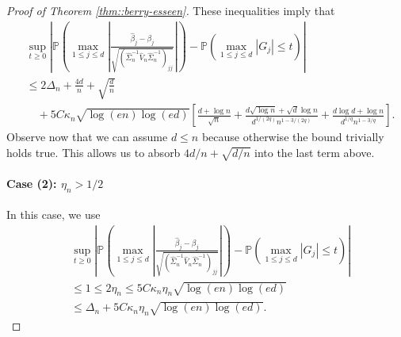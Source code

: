 \documentclass[11pt]{article}
\begin{document}
\begin{appendices}
\begin{proof}[Proof of Theorem \ref{thm::berry-esseen}]
These inequalities imply that
\begin{align*}
&\sup_{t\ge 0}\left|\mathbb{P}\left(\max_{1\le j\le d}\left|\frac{\widehat{\beta}_j - \beta_j}{\sqrt{(\widehat{\Sigma}_n^{-1}\widehat{V}_n\widehat{\Sigma}_n^{-1})_{jj}}}\right|\right) - \mathbb{P}\left(\max_{1\le j\le d}|G_j| \le t\right)\right|\\
&\le 2\Delta_n + \frac{4d}{n} + \sqrt{\frac{d}{n}}\\ 
&\quad+ 5C\kappa_n\sqrt{\log(en)\log(ed)}\left[\frac{d + \log n}{\sqrt{n}} + \frac{d\sqrt{\log n} + \sqrt{d}\log n}{d^{1/(2q)}n^{1-3/(2q)}} + \frac{d\log d + \log n}{d^{1/q}n^{1-3/q}}\right].
\end{align*}
Observe now that we can assume $d \le n$ because otherwise the bound trivially holds true. This allows us to absorb $4d/n + \sqrt{d/n}$ into the last term above.
\paragraph{Case (2): $\eta_n > 1/2$} In this case, we use
\begin{align*}
&\sup_{t\ge 0}\left|\mathbb{P}\left(\max_{1\le j\le d}\left|\frac{\widehat{\beta}_j - \beta_j}{\sqrt{(\widehat{\Sigma}_n^{-1}\widehat{V}_n\widehat{\Sigma}_n^{-1})_{jj}}}\right|\right) - \mathbb{P}\left(\max_{1\le j\le d}|G_j| \le t\right)\right|\\ 
&\le 1 \le 2\eta_n \le 5C\kappa_n\eta_n\sqrt{\log(en)\log(ed)}\\ 
&\le \Delta_n + 5C\kappa_n\eta_n\sqrt{\log(en)\log(ed)}.
\end{align*}


\end{proof}
\end{appendices}
\end{document}
